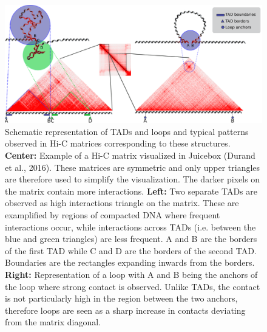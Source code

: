 \documentclass[11pt,a4paper]{report}
\begin{document}
\begin{figure}[ht]
	\includegraphics[width=1\textwidth]{Figures/3_TAD_loop_definition.pdf}
	\caption{Schematic representation of TADs and loops and typical patterns  observed in Hi-C matrices corresponding to these structures. \textbf{Center: } Example of a Hi-C matrix visualized in Juicebox (Durand et al., 2016)⁠. These matrices are symmetric and only upper triangles are therefore used to simplify the visualization. The darker pixels on the matrix contain more interactions. \textbf{Left: }Two separate TADs are observed as high interactions triangle on the matrix. These are examplified by regions of compacted DNA where frequent interactions occur, while interactions across TADs (i.e. between the blue and green triangles) are less frequent. A and B are the borders of the first TAD while C and D are the borders of the second TAD. Boundaries are the rectangles expanding inwards from the borders. \textbf{Right:} Representation of a loop with A and B being the anchors of the loop where strong contact is observed. Unlike TADs, the contact is not particularly high in the region between the two anchors, therefore loops are seen as a sharp increase in contacts deviating from the matrix diagonal. }
	\label{TAD_loop_def}
\end{figure}
\end{document}
